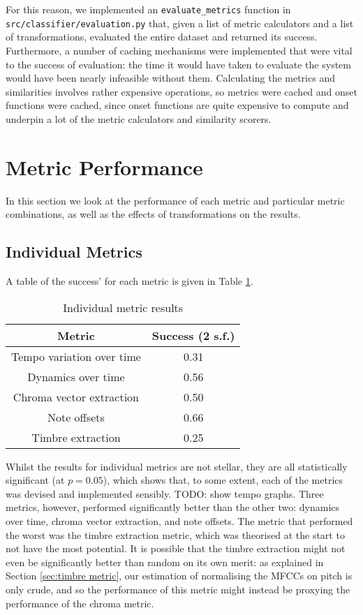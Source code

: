 \documentclass[oneside, class=book, 12pt, crop=false]{standalone}
\begin{document}
For this reason, we implemented an \texttt{evaluate\_metrics} function in \texttt{src/classifier/evaluation.py} that, given a list of metric calculators and a list of transformations, evaluated the entire dataset and returned its success. Furthermore, a number of caching mechanisms were implemented that were vital to the success of evaluation: the time it would have taken to evaluate the system would have been nearly infeasible without them. Calculating the metrics and similarities involves rather expensive operations, so metrics were cached and onset functions were cached, since onset functions are quite expensive to compute and underpin a lot of the metric calculators and similarity scorers.

\section{Metric Performance}

In this section we look at the performance of each metric and particular metric combinations, as well as the effects of transformations on the results.

\subsection{Individual Metrics}

A table of the success' for each metric is given in Table \ref{table:metric results}. 

\begin{table}[h]
    \centering
    \begin{tabular}{cc}
        \textbf{Metric}&\textbf{Success} (2 s.f.) \\
        \midrule[0.15em]
        Tempo variation over time&0.31 \\
        Dynamics over time&0.56 \\
         Chroma vector extraction&0.50 \\
         Note offsets&0.66 \\
         Timbre extraction&0.25\\
    \end{tabular}
    \caption{Individual metric results}
    \label{table:metric results}
\end{table}

Whilst the results for individual metrics are not stellar, they are all statistically significant (at $p=0.05$), which shows that, to some extent, each of the metrics was devised and implemented sensibly. TODO: show tempo graphs. Three metrics, however, performed significantly better than the other two: dynamics over time, chroma vector extraction, and note offsets. The metric that performed the worst was the timbre extraction metric, which was theorised at the start to not have the most potential. It is possible that the timbre extraction might not even be significantly better than random on its own merit: as explained in Section \ref{sec:timbre metric}, our estimation of normalising the MFCCs on pitch is only crude, and so the performance of this metric might instead be proxying the performance of the chroma metric.
\end{document}
